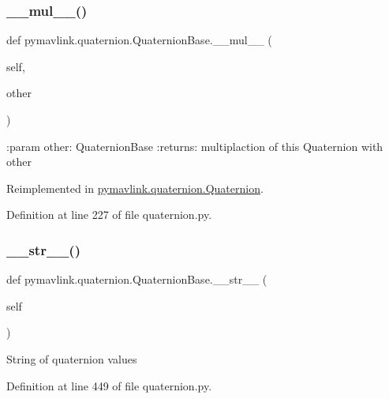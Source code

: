 \subsubsection{\texorpdfstring{\_\_mul\_\_()}{\_\_mul\_\_()}}
{\footnotesize\ttfamily def pymavlink.\+quaternion.\+Quaternion\+Base.\+\_\+\+\_\+mul\+\_\+\+\_\+ (\begin{DoxyParamCaption}\item[{}]{self,  }\item[{}]{other }\end{DoxyParamCaption})}

\begin{DoxyVerb}:param other: QuaternionBase
:returns: multiplaction of this Quaternion with other
\end{DoxyVerb}
 

Reimplemented in \mbox{\hyperlink{classpymavlink_1_1quaternion_1_1Quaternion_af3d7ea873b5cc8bea69d2664b8e6dcc9}{pymavlink.\+quaternion.\+Quaternion}}.



Definition at line 227 of file quaternion.\+py.

\mbox{\label{classpymavlink_1_1quaternion_1_1QuaternionBase_a2c8b45efc655d4220042a132c4255f01}} 
\subsubsection{\texorpdfstring{\_\_str\_\_()}{\_\_str\_\_()}}
{\footnotesize\ttfamily def pymavlink.\+quaternion.\+Quaternion\+Base.\+\_\+\+\_\+str\+\_\+\+\_\+ (\begin{DoxyParamCaption}\item[{}]{self }\end{DoxyParamCaption})}

\begin{DoxyVerb}String of quaternion values\end{DoxyVerb}
 

Definition at line 449 of file quaternion.\+py.

\mbox{\label{classpymavlink_1_1quaternion_1_1QuaternionBase_acdb6fa13b26fc10c02eb40ee51de6899}} 
